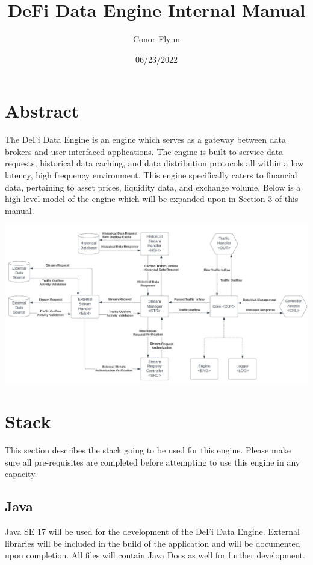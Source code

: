 \documentclass{article}
\title{DeFi Data Engine Internal Manual}
\author{Conor Flynn}
\date{06/23/2022}
\begin{document}
\maketitle
\cleardoublepage

\tableofcontents


\cleardoublepage
\section{Abstract}
The DeFi Data Engine is an engine which serves as a gateway between data brokers and user interfaced applications. The engine is built to service data requests, historical data caching, and data distribution protocols all within a low latency, high frequency environment. This engine specifically caters to financial data, pertaining to asset prices, liquidity data, and exchange volume. Below is a high level model of the engine which will be expanded upon in Section 3 of this manual.

\begin{center}
\includegraphics[scale=0.5]{data-core-framework}
\end{center}

\section{Stack}
This section describes the stack going to be used for this engine. Please make sure all pre-requisites are completed before attempting to use this engine in any capacity.

\subsection{Java}
Java SE 17 will be used for the development of the DeFi Data Engine. External libraries will be included in the build of the application and will be documented upon completion. All files will contain Java Docs as well for further development.\\
\end{document}

